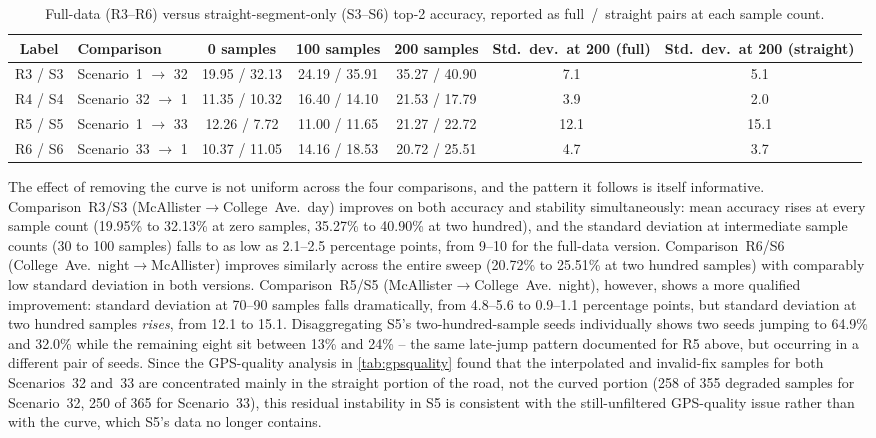 \documentclass{iutbscthesis}
\begin{document}
\begin{table}[H]
    \centering
    \begin{tabular}{c l c c c c c}
        \toprule
        Label & Comparison & 0 samples & 100 samples & 200 samples & Std.\ dev.\ at 200 (full) & Std.\ dev.\ at 200 (straight) \\
        \midrule
        R3 / S3 & Scenario~1 $\to$ 32 & 19.95 / 32.13 & 24.19 / 35.91 & 35.27 / 40.90 & 7.1 & 5.1 \\
        R4 / S4 & Scenario~32 $\to$ 1 & 11.35 / 10.32 & 16.40 / 14.10 & 21.53 / 17.79 & 3.9 & 2.0 \\
        R5 / S5 & Scenario~1 $\to$ 33 & 12.26 / 7.72 & 11.00 / 11.65 & 21.27 / 22.72 & 12.1 & 15.1 \\
        R6 / S6 & Scenario~33 $\to$ 1 & 10.37 / 11.05 & 14.16 / 18.53 & 20.72 / 25.51 & 4.7 & 3.7 \\
        \bottomrule
    \end{tabular}
    \caption{Full-data (R3--R6) versus straight-segment-only (S3--S6) top-2 accuracy, reported as full~/~straight pairs at each sample count.}
    \label{tab:straightvsfull}
\end{table}

The effect of removing the curve is not uniform across the four comparisons, and the pattern it follows is itself informative. Comparison~R3/S3 (McAllister$\to$College~Ave.\ day) improves on both accuracy and stability simultaneously: mean accuracy rises at every sample count (19.95\% to 32.13\% at zero samples, 35.27\% to 40.90\% at two hundred), and the standard deviation at intermediate sample counts (30 to 100 samples) falls to as low as 2.1--2.5 percentage points, from 9--10 for the full-data version. Comparison~R6/S6 (College~Ave.\ night$\to$McAllister) improves similarly across the entire sweep (20.72\% to 25.51\% at two hundred samples) with comparably low standard deviation in both versions. Comparison~R5/S5 (McAllister$\to$College~Ave.\ night), however, shows a more qualified improvement: standard deviation at 70--90 samples falls dramatically, from 4.8--5.6 to 0.9--1.1 percentage points, but standard deviation at two hundred samples \emph{rises}, from 12.1 to 15.1. Disaggregating S5's two-hundred-sample seeds individually shows two seeds jumping to 64.9\% and 32.0\% while the remaining eight sit between 13\% and 24\% -- the same late-jump pattern documented for R5 above, but occurring in a different pair of seeds. Since the GPS-quality analysis in \autoref{tab:gpsquality} found that the interpolated and invalid-fix samples for both Scenarios~32 and~33 are concentrated mainly in the straight portion of the road, not the curved portion (258 of 355 degraded samples for Scenario~32, 250 of 365 for Scenario~33), this residual instability in S5 is consistent with the still-unfiltered GPS-quality issue rather than with the curve, which S5's data no longer contains.
\end{document}
